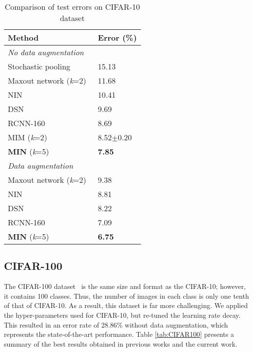 \documentclass[10pt,twocolumn,letterpaper]{article}
\begin{document}
\begin{table}
\begin{center}
\caption{Comparison of test errors on CIFAR-10 dataset}
\begin{tabular}{|p{1.6in}|p{0.6in}|} \hline 
Method & Error (\%) \\ \hline 
\multicolumn{2}{|p{1.6in}|}{\textit{No data augmentation}} \\ \hline 
Stochastic pooling~\cite{zeiler2013stochastic} & 15.13 \\ \hline 
Maxout network (\textit{k}=2)~\cite{goodfellow2013maxout} & 11.68 \\ \hline 
NIN~\cite{DBLP:journals/corr/LinCY13} & 10.41 \\ \hline 
DSN~\cite{lee2014deeply} & 9.69 \\ \hline 
RCNN-160~\cite{Liang_2015_CVPR} & 8.69 \\ \hline
MIM (\textit{k}=2)~\cite{liao2015importance} & 8.52$\pm $0.20 \\ \hline 
\textbf{MIN} (\textit{k}=5)\textbf{} & \textbf{7.85} \\ \hline
\multicolumn{2}{|p{1.6in}|}{\textit{Data augmentation}} \\ \hline 
Maxout network (\textit{k}=2)~\cite{goodfellow2013maxout} & 9.38 \\ \hline 
NIN~\cite{DBLP:journals/corr/LinCY13} & 8.81 \\ \hline 
DSN~\cite{lee2014deeply} & 8.22 \\ \hline 
RCNN-160~\cite{Liang_2015_CVPR} & 7.09 \\ \hline
\textbf{MIN} (\textit{k}=5)\textbf{} & \textbf{6.75} \\ \hline
\end{tabular}
\label{tab:CIFAR10}
\end{center}
\end{table}

\subsection{CIFAR-100}
The CIFAR-100 dataset~\cite{krizhevsky2009learning} is the same size and format as the CIFAR-10; however, it contains 100 classes. Thus, the number of images in each class is only one tenth of that of CIFAR-10. As a result, this dataset is far more challenging. We applied the hyper-parameters used for CIFAR-10, but re-tuned the learning rate decay. This resulted in an error rate of 28.86\% without data augmentation, which represents the state-of-the-art performance. Table \ref{tab:CIFAR100} presents a summary of the best results obtained in previous works and the current work.
\end{document}
